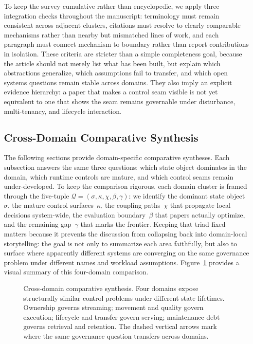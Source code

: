 \documentclass[acmsmall,screen,review]{acmart}
\begin{document}
To keep the survey cumulative rather than encyclopedic, we apply three integration checks throughout the manuscript: terminology must remain consistent across adjacent clusters, citations must resolve to clearly comparable mechanisms rather than nearby but mismatched lines of work, and each paragraph must connect mechanism to boundary rather than report contributions in isolation. These criteria are stricter than a simple completeness goal, because the article should not merely list what has been built, but explain which abstractions generalize, which assumptions fail to transfer, and which open systems questions remain stable across domains. They also imply an explicit evidence hierarchy: a paper that makes a control seam visible is not yet equivalent to one that shows the seam remains governable under disturbance, multi-tenancy, and lifecycle interaction.

\subsection{Cross-Domain Comparative Synthesis}

The following sections provide domain-specific comparative syntheses. Each subsection answers the same three questions: which state object dominates in the domain, which runtime controls are mature, and which control seams remain under-developed. To keep the comparison rigorous, each domain cluster is framed through the five-tuple $\mathcal{Q}=(\sigma,\kappa,\chi,\beta,\gamma)$: we identify the dominant state object~$\sigma$, the mature control surfaces~$\kappa$, the coupling paths~$\chi$ that propagate local decisions system-wide, the evaluation boundary~$\beta$ that papers actually optimize, and the remaining gap~$\gamma$ that marks the frontier. Keeping that triad fixed matters because it prevents the discussion from collapsing back into domain-local storytelling: the goal is not only to summarize each area faithfully, but also to surface where apparently different systems are converging on the same governance problem under different names and workload assumptions. Figure~\ref{fig:cross-domain} provides a visual summary of this four-domain comparison.

\begin{figure}[t]
\centering
\resizebox{0.96\textwidth}{!}{}
\caption{Cross-domain comparative synthesis. Four domains expose structurally similar control problems under different state lifetimes. Ownership governs streaming; movement and quality govern execution; lifecycle and transfer govern serving; maintenance debt governs retrieval and retention. The dashed vertical arrows mark where the same governance question transfers across domains.}
\label{fig:cross-domain}
\end{figure}
\end{document}
